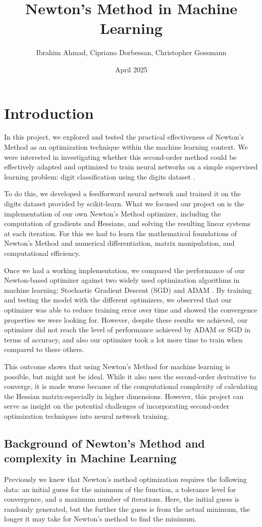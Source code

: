 \documentclass[10pt]{article}
\title{Newton's Method in Machine Learning }
\author{Ibrahim Ahmad, Cipriano Dorbessan, Christopher Gossmann}
\date{April 2025}
\begin{document}
\maketitle
\section{Introduction}
In this project, we explored and tested the practical effectiveness of Newton's Method as an optimization technique within the machine learning context. We were interested in investigating whether this second-order method could be effectively adapted and optimized to train neural networks on a simple supervised learning problem: digit classification using the digits dataset \cite{digits}.

To do this, we developed a feedforward neural network and trained it on the digits dataset provided by scikit-learn. What we focused our project on is the implementation of our own Newton's Method optimizer, including the computation of gradients and Hessians, and solving the resulting linear systems at each iteration. For this we had to learn the mathematical foundations of Newton's Method and numerical differentiation, matrix manipulation, and computational efficiency.

Once we had a working implementation, we compared the performance of our Newton-based optimizer against two widely used optimization algorithms in machine learning: Stochastic Gradient Descent (SGD)\cite{contributors-2020-stochastic} and ADAM \cite{kingma2017adammethodstochasticoptimization}. By training and testing the model with the different optimizers, we observed that our optimizer was able to reduce training error over time and showed the convergence properties we were looking for. However, despite these results we achieved, our optimizer did not reach the level of performance achieved by ADAM or SGD in terms of accuracy, and also our optimizer took a lot more time to train when compared to these others.

This outcome shows that using Newton's Method for machine learning is possible, but might not be ideal. While it also uses the second-order derivative to converge, it is made worse because of the computational complexity of calculating the Hessian matrix-especially in higher dimensions. However, this project can serve as insight on the potential challenges of incorporating second-order optimization techniques into neural network training.
\newpage
\subsection{Background of Newton's Method and complexity in Machine Learning}
Previously we knew that Newton’s method optimization requires the following data: an initial guess for the minimum of the function, a tolerance level for convergence, and a maximum number of iterations. Here, the initial guess is randomly generated, but the further the guess is from the actual minimum, the longer it may take for Newton’s method to find the minimum.
\end{document}
